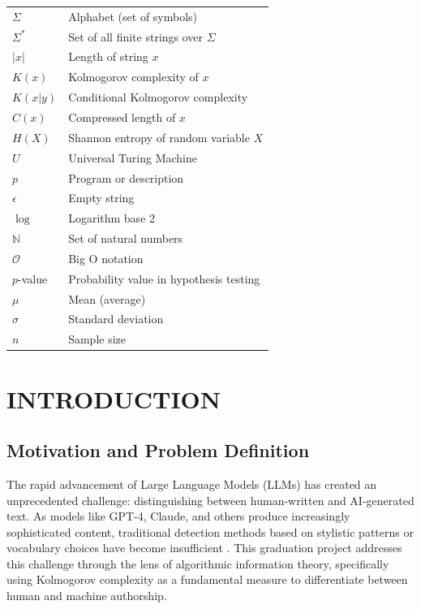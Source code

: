 \documentclass[12pt,a4paper]{report}
\begin{document}
\begin{tabular}{ll}
$\Sigma$ & Alphabet (set of symbols)\\
$\Sigma^*$ & Set of all finite strings over $\Sigma$\\
$|x|$ & Length of string $x$\\
$K(x)$ & Kolmogorov complexity of $x$\\
$K(x|y)$ & Conditional Kolmogorov complexity\\
$C(x)$ & Compressed length of $x$\\
$H(X)$ & Shannon entropy of random variable $X$\\
$U$ & Universal Turing Machine\\
$p$ & Program or description\\
$\epsilon$ & Empty string\\
$\log$ & Logarithm base 2\\
$\mathbb{N}$ & Set of natural numbers\\
$\mathcal{O}$ & Big O notation\\
$p$-value & Probability value in hypothesis testing\\
$\mu$ & Mean (average)\\
$\sigma$ & Standard deviation\\
$n$ & Sample size\\
\end{tabular}

\setcounter{page}{1}

\chapter{INTRODUCTION}

\section{Motivation and Problem Definition}

The rapid advancement of Large Language Models (LLMs) has created an unprecedented challenge: distinguishing between human-written and AI-generated text. As models like GPT-4, Claude, and others produce increasingly sophisticated content, traditional detection methods based on stylistic patterns or vocabulary choices have become insufficient \cite{kolmogorov1965three}. This graduation project addresses this challenge through the lens of algorithmic information theory, specifically using Kolmogorov complexity as a fundamental measure to differentiate between human and machine authorship.
\end{document}
